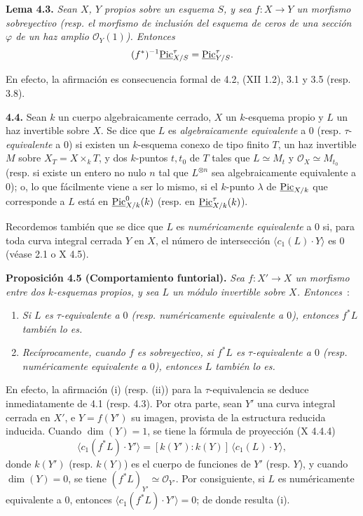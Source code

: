\textbf{Lema 4.3.} \emph{Sean \(X\), \(Y\) propios sobre un esquema \(S\), y
sea \(f:X\to Y\) un morfismo sobreyectivo (resp. el morfismo de inclusión del
esquema de ceros de una sección \(\varphi\) de un haz amplio
\(\mathcal O_Y(1)\)). Entonces}
\[
  (f^*)^{-1}\underline{\operatorname{Pic}}^\tau_{X/S}=\underline{\operatorname{Pic}}^\tau_{Y/S}.
\]

En efecto, la afirmación es consecuencia formal de 4.2, (XII 1.2), 3.1 y 3.5
(resp. 3.8).

\textbf{4.4.} Sean \(k\) un cuerpo algebraicamente cerrado, \(X\) un
\(k\)-esquema propio y \(L\) un haz invertible sobre \(X\). Se dice que \(L\)
es \emph{algebraicamente equivalente} a \(0\) (resp.
\(\tau\)-\emph{equivalente} a \(0\)) si existen un \(k\)-esquema conexo de
tipo finito \(T\), un haz invertible \(M\) sobre
\(X_T=X\times_k T\), y dos \(k\)-puntos \(t,t_0\) de \(T\) tales que
\(L\simeq M_t\) y \(\mathcal O_X\simeq M_{t_0}\) (resp. si existe un entero
no nulo \(n\) tal que \(L^{\otimes n}\) sea algebraicamente equivalente a
\(0\)); o, lo que fácilmente viene a ser lo mismo, si el \(k\)-punto
\(\lambda\) de \(\underline{\operatorname{Pic}}_{X/k}\) que corresponde a \(L\) está en
\(\underline{\operatorname{Pic}}^0_{X/k}(k)\) (resp. en
\(\underline{\operatorname{Pic}}^\tau_{X/k}(k)\)).

Recordemos también que se dice que \(L\) es \emph{numéricamente equivalente}
a \(0\) si, para toda curva integral cerrada \(Y\) en \(X\), el número de
intersección \(\langle c_1(L)\cdot Y\rangle\) es \(0\) (véase 2.1 o X 4.5).

\textbf{Proposición 4.5 (Comportamiento funtorial).} \emph{Sea
\(f:X'\to X\) un morfismo entre dos \(k\)-esquemas propios, y sea \(L\) un
módulo invertible sobre \(X\). Entonces}~:
\begin{enumerate}[label=(\roman*)]
\item \emph{Si \(L\) es \(\tau\)-equivalente a \(0\) (resp. numéricamente
equivalente a \(0\)), entonces \(f^*L\) también lo es.}
\item \emph{Recíprocamente, cuando \(f\) es sobreyectivo, si \(f^*L\) es
\(\tau\)-equivalente a \(0\) (resp. numéricamente equivalente a \(0\)),
entonces \(L\) también lo es.}
\end{enumerate}

En efecto, la afirmación (i) (resp. (ii)) para la \(\tau\)-equivalencia se
deduce inmediatamente de 4.1 (resp. 4.3). Por otra parte, sean \(Y'\) una
curva integral cerrada en \(X'\), e \(Y=f(Y')\) su imagen, provista de la
estructura reducida inducida. Cuando \(\dim(Y)=1\), se tiene la fórmula de
proyección (X 4.4.4)
\[
  \tag*{4.5.1.}
  \langle c_1(f^*L)\cdot Y'\rangle
  =[k(Y'):k(Y)]\,\langle c_1(L)\cdot Y\rangle,
\]
donde \(k(Y')\) (resp. \(k(Y)\)) es el cuerpo de funciones de \(Y'\) (resp.
\(Y\)), y cuando \(\dim(Y)=0\), se tiene
\((f^*L)_{Y'}\simeq\mathcal O_{Y'}\). Por consiguiente, si \(L\) es
numéricamente equivalente a \(0\), entonces
\(\langle c_1(f^*L)\cdot Y'\rangle=0\); de donde resulta (i).

